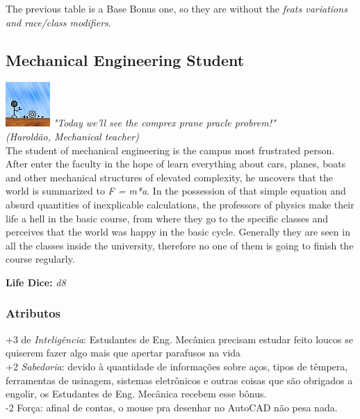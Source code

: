 \documentclass[ letterpaper,12pt]{article}
\begin{document}
The previous table is a Base Bonus one, so they are without the {\it feats variations and race/class modifiers}.\\

\subsection{Mechanical Engineering Student}
\includegraphics{../data/classes/Img/engmecanica.png}
{\it "Today we'll see the comprex prane pracle probrem!"\\ (Haroldão, Mechanical teacher)}\\

The student of mechanical engineering is the campus most frustrated person. After enter the faculty in the hope of learn everything about cars, planes, boats and other mechanical structures of elevated complexity, he uncovers that the world is summarized to {\it F = m*a}. In the possession of that simple equation and absurd quantities of inexplicable calculations, the professors of physics make their life a hell in the basic course, from where they go to the specific classes and perceives that the world was happy in the basic cycle. Generally they are seen in all the classes inside the university, therefore no one of them is going to finish the course regularly. 

{\bf Life Dice: } {\it d8}

\subsubsection{Atributos}
+3 de {\it Inteligência}: Estudantes de Eng. Mecânica precisam estudar feito loucos se quiserem fazer algo mais que apertar parafusos na vida\\
+2 {\it Sabedoria}: devido à quantidade de informações sobre aços, tipos de têmpera, ferramentas de usinagem, sistemas eletrônicos e outras coisas que são obrigados a engolir, os Estudantes de Eng. Mecânica recebem esse bônus.\\
-2 Força: afinal de contas, o mouse pra desenhar no AutoCAD não pesa nada.\\
\end{document}
